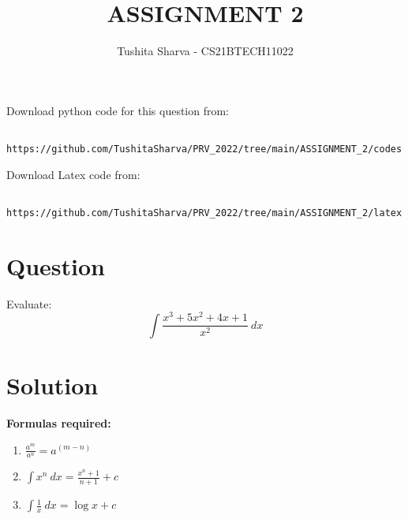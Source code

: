 \documentclass[journal,12pt,twocolumn]{IEEEtran}
\title{ASSIGNMENT 2}
\author{Tushita Sharva - CS21BTECH11022}
\begin{document}
\providecommand{\brak}[1]{\ensuremath{\left(#1\right)}}
\renewcommand\thesection{\arabic{section}}
\renewcommand\thesubsection{\thesection.\arabic{subsection}}
\renewcommand\thesubsubsection{\thesubsection.\arabic{subsubsection}}
\newcommand{\question}{\noindent \textbf{Question: }}
\newcommand{\solution}{\noindent \textbf{Solution: }}
\newcommand{\formulas}{\noindent \textbf{Formulas required:}}
\newcommand{\answer}{\noindent \textbf{Final Answer:}}

\maketitle

Download python code for this question from:

\begin{lstlisting}
  https://github.com/TushitaSharva/PRV_2022/tree/main/ASSIGNMENT_2/codes
\end{lstlisting}

Download Latex code from: 
\begin{lstlisting}
    https://github.com/TushitaSharva/PRV_2022/tree/main/ASSIGNMENT_2/latex
\end{lstlisting}
\bigskip

\section{Question}
Evaluate: $$\int \frac{x^3 + 5x^2 + 4x + 1}{x^2}\ dx$$
\bigskip

\section{Solution}

\bigskip

\formulas
\begin{enumerate}
    \item $ \frac{a^m}{a^n} = a^\brak{m-n}$ \\
    \item $\int x^n\ dx = \frac{x^n+1}{n+1} + c$\\
    \item $\int \frac{1}{x}\ dx = \log x + c$\\
\end{enumerate}

\bigskip
\end{document}
